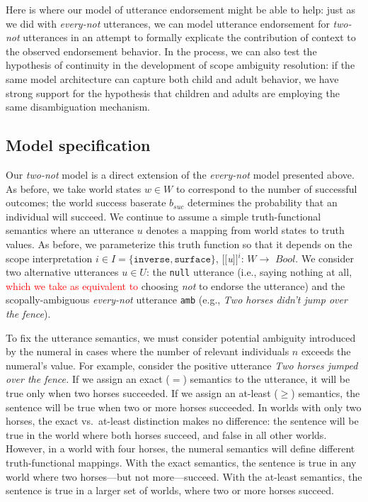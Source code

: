 \documentclass[preprint,authoryear]{elsarticle}\frenchspacing
\newcommand{\sem}[1]{\mbox{$[\![$#1$]\!]$}}
\newcommand{\lp}[1]{\textcolor{red}{#1}} %
\begin{document}
Here is where our model of utterance endorsement might be able to help: just as we did with \emph{every-not} utterances, we can model utterance endorsement for \emph{two-not} utterances in an attempt to formally explicate the contribution of context to the observed endorsement behavior. In the process, we can also test the hypothesis of continuity in the development of scope ambiguity resolution: if the same model architecture can capture both child and adult behavior, we have strong support for the hypothesis that children and adults are employing the same disambiguation mechanism.


\subsection{Model specification} \label{two-model-specification}

Our \emph{two-not} model is a direct extension of the \emph{every-not} model presented above. As before, we take world states $w\in W$ to correspond to the number of successful outcomes; the world success baserate $b_{suc}$ determines the probability that an individual will succeed. We continue to assume a simple truth-functional semantics where an utterance $u$ denotes a mapping from world states to truth values. As before, we parameterize this truth function so that it depends on the scope interpretation $i \in I = \{\texttt{inverse}, \texttt{surface}\}$, \sem{\textit{u}}$^{i}$: $W\rightarrow$ $Bool$. We consider two alternative utterances $u \in U$: the \texttt{null} utterance (i.e., saying nothing at all, \lp{which we take as equivalent to} choosing \emph{not} to endorse the utterance) and the scopally-ambiguous \emph{every-not} utterance \texttt{amb} (e.g., \textit{Two horses didn't jump over the fence}).  

To fix the utterance semantics, we must consider potential ambiguity introduced by the numeral in cases where the number of relevant individuals $n$ exceeds the numeral's value. For example, consider the positive utterance \textit{Two horses jumped over the fence.} If we assign an {exact} ($=$) semantics to the utterance, it will be true only when two horses succeeded. If we assign an {at-least} ($\geq$) semantics, the sentence will be true when two or more horses succeeded. In worlds with only two horses, the exact vs.~at-least distinction makes no difference: the sentence will be true in the world where both horses succeed, and false in all other worlds. However, in a world with four horses, the numeral semantics will define different truth-functional mappings. With the exact semantics, the sentence is true in any world where two horses---but not more---succeed. With the at-least semantics, the sentence is true in a larger set of worlds,  where two or more horses succeed. 
\end{document}
